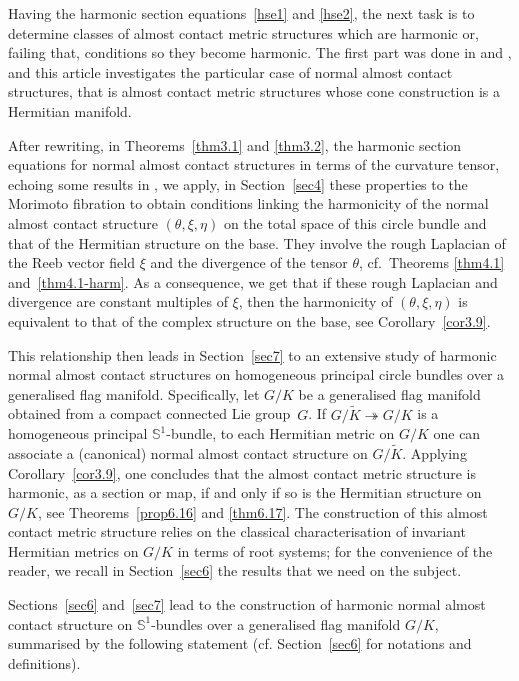 \documentclass[a4paper,reqno]{amsart}
\theoremstyle{definition}
\theoremstyle{remark}
\theoremstyle{plain}
\numberwithin{equation}{section}
\newcommand{\bbS}{{\mathbb{S}}}
\newcommand{\sto}{\twoheadrightarrow}
\newcommand{\Mt}{{\widetilde{M}}}
\newcommand{\wK}{{\widetilde{K}}}
\newcommand{\NACS}{normal almost contact structure\xspace}
\begin{document}
Having the harmonic section equations~\eqref{hse1} and
\eqref{hse2}, the next task is to determine classes of almost
contact metric structures  which
are harmonic or, failing that, conditions so they become
harmonic. The first part was done in \cite{VW1,VW2} and
\cite{LV}, and this article investigates the particular case of
normal almost contact structures, that is almost contact metric structures whose cone construction is a Hermitian manifold.

After rewriting, in Theorems~\ref{thm3.1} and \ref{thm3.2},
the harmonic section equations for normal almost contact
structures in terms of the curvature tensor, echoing some results
in \cite{CMW2}, we apply, in Section~\ref{sec4} these properties
to the Morimoto fibration to obtain conditions linking the
harmonicity of the normal almost contact structure
$(\theta,\xi,\eta)$ on the total space of this circle bundle and
that of the Hermitian structure on the base.  They involve the
rough Laplacian of the Reeb vector field $\xi$ and the divergence of
the tensor $\theta$, %
cf.~Theorems \ref{thm4.1} and~\ref{thm4.1-harm}.   As a
consequence, we  get that   if these  rough Laplacian and divergence are
constant multiples of $\xi$, then the harmonicity of
$(\theta,\xi,\eta)$ is equivalent to that of the complex
structure on the base, see Corollary~\ref{cor3.9}.


This relationship then leads in Section~\ref{sec7} to an
extensive study of harmonic normal almost contact structures on
homogeneous principal circle bundles
over a generalised flag manifold. Specifically, let $G/K$ be a
generalised flag manifold obtained from a compact connected Lie
group~$G$.
If $G/\wK \sto G/K$ is a homogeneous principal $\bbS^1$-bundle, to each
Hermitian metric on $G/K$ one can associate  a (canonical) normal
almost contact structure on $G/\wK$. Applying Corollary~\ref{cor3.9},
one concludes %
that the almost contact metric structure is harmonic, as
a section or map, if and only if so is the Hermitian structure
on~$G/K$, see Theorems~\ref{prop6.16} and
\ref{thm6.17}. The construction of this almost contact metric structure
relies on the classical characterisation of invariant Hermitian
metrics on $G/K$ in terms of root systems; for the convenience of
the reader, we recall in Section~\ref{sec6} the results that we
need on the subject. 

Sections~\ref{sec6} and~\ref{sec7} lead to the construction of harmonic \NACS on $\bbS^1$-bundles over a generalised flag manifold $G/K$, summarised by the following statement (cf. Section~\ref{sec6} for notations and definitions).
\end{document}
